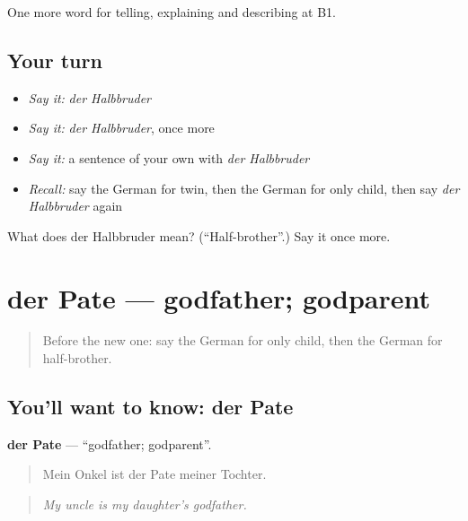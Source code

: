 \begin{grammarlens}[title={What you've built}]
One more word for telling, explaining and describing at B1.
\end{grammarlens}

\subsection*{Your turn}
\begin{itemize}
\raggedright
  \item \emph{Say it:} \emph{der Halbbruder}
  \item \emph{Say it:} \emph{der Halbbruder}, once more
  \item \emph{Say it:} a sentence of your own with \emph{der Halbbruder}
  \item \emph{Recall:} say the German for twin, then the German for only child, then say \emph{der Halbbruder} again
\end{itemize}

\begin{tcolorbox}[breakable,colback=teal!4,colframe=teal!35!black,title={Before you move on}]
What does der Halbbruder mean? (\textquotedblleft{}Half-brother\textquotedblright{}.) Say it once more.
\end{tcolorbox}
\section[der Pate]{der Pate — godfather; godparent}

\label{lesson:GE-C491-pate}



\begin{quote}
Before the new one: say the German for only child, then the German for half-brother.
\end{quote}

\subsection*{You'll want to know: der Pate}
\textbf{der Pate} — \textquotedblleft{}godfather; godparent\textquotedblright{}.

\begin{quote}
Mein Onkel ist der Pate meiner Tochter.
\end{quote}

\begin{quote}
\emph{My uncle is my daughter's godfather.}
\end{quote}

